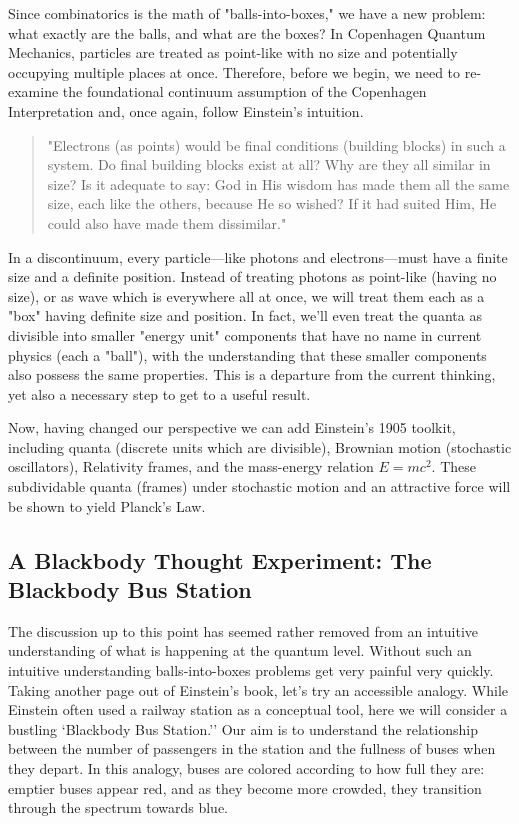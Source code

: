 \documentclass{article}
\begin{document}
Since combinatorics is the math of "balls-into-boxes," we have a new problem: what exactly are the balls, and what are the boxes? In Copenhagen Quantum Mechanics, particles are treated as point-like with no size and potentially occupying multiple places at once. Therefore, before we begin, we need to re-examine the foundational continuum assumption of the Copenhagen Interpretation and, once again, follow Einstein's intuition.

\begin{quotation}
    "Electrons (as points) would be final conditions (building blocks) in such a system. Do final building blocks exist at all?  Why are they all similar in size? Is it adequate to say: God in His wisdom has made them all the same size, each like the others, because He so wished? If it had suited Him, He could also have made them dissimilar." \cite{Einstein314}
\end{quotation}

In a discontinuum, every particle—like photons and electrons—must have a finite size and a definite position. Instead of treating photons as point-like (having no size), or as wave which is everywhere all at once, we will treat them each as a "box" having definite size and position. In fact, we'll even treat the quanta as divisible into smaller "energy unit" components that have no name in current physics (each a "ball"), with the understanding that these smaller components also possess the same properties. This is a departure from the current thinking, yet also a necessary step to get to a useful result.

Now, having changed our perspective we can add Einstein's 1905 toolkit, including quanta (discrete units which are divisible), Brownian motion (stochastic oscillators), Relativity frames, and the mass-energy relation $E=mc^2$. These subdividable quanta (frames) under stochastic motion and an attractive force will be shown to yield Planck’s Law.


\subsection*{A Blackbody Thought Experiment: The Blackbody Bus Station}

The discussion up to this point has seemed rather removed from an intuitive understanding of what is happening at the quantum level. Without such an intuitive understanding balls-into-boxes problems get very painful very quickly. Taking another page out of Einstein's book, let's try an accessible analogy. While Einstein often used a railway station as a conceptual tool, here we will consider a bustling `Blackbody Bus Station.'' Our aim is to understand the relationship between the number of passengers in the station and the fullness of buses when they depart. In this analogy, buses are colored according to how full they are: emptier buses appear red, and as they become more crowded, they transition through the spectrum towards blue.
\end{document}
